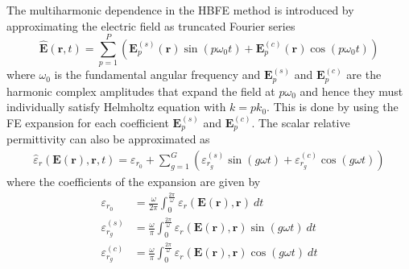 \documentclass[journal,twoside]{IEEEtran}
\renewcommand{\vec}[1]{\mathbf{#1}}
\begin{document}
The multiharmonic dependence in the HBFE method is introduced
by approximating the electric field as truncated Fourier series
\cite{Copeland2010}
%
\begin{equation} \label{eq:field}
\vec{\hat{E}}(\vec{r}, t) = \sum^P_{p=1} \left( \vec{E}_{p}^{(s)}(\vec{r}) 
\sin(p\omega_0 t) + \vec{E}_p^{(c)}(\vec{r}) \cos(p \omega_0 t) \right)
\end{equation}
%
\noindent where $\omega_0$ is the fundamental angular frequency and
$\vec{E}_{p}^{(s)}$ and $\vec{E}_{p}^{(c)}$ are the harmonic complex amplitudes 
that expand the field at $p\omega_0$ and hence they must individually
satisfy Helmholtz equation with $k=pk_0$. 
This is done 
by using the FE expansion for each coefficient 
$\vec{E}_{p}^{(s)}$ and $\vec{E}_{p}^{(c)}$.
The scalar relative permittivity can also be approximated as \cite{Copeland2010}
%
\begin{eqnarray} \label{eq:eps}
\hat{{\varepsilon}}_r(\vec{E}(\vec{r}), \vec{r}, t) = {\varepsilon}_{r_0} + 
\sum^G_{g=1} \left( {\varepsilon}_{r_g}^{(s)} \sin(g \omega t) + 
{\varepsilon}_{r_g}^{(c)} \cos(g \omega t)
\right)
\end{eqnarray} 
\noindent where the coefficients of the expansion are given by
\begin{align} \label{eq:epsCoeffs}
{\varepsilon}_{r_{0}} &=  \frac{\omega}{2\pi}\int_0^{\frac{2\pi}{\omega}}
{\varepsilon}_r(\vec{E}(\vec{r}), \vec{r}) \ dt \nonumber \\
{\varepsilon}_{r_{g}}^{(s)} &=  \frac{\omega}{\pi}\int_0^{\frac{2\pi}{\omega}}
{\varepsilon}_r(\vec{E}(\vec{r}), \vec{r}) \sin(g \omega t) \ dt \\ 
{\varepsilon}_{r_{g}}^{(c)} &=  \frac{\omega}{\pi}\int_0^{\frac{2\pi}{\omega}} 
{\varepsilon}_r(\vec{E}(\vec{r}), \vec{r}) \cos(g \omega t) \ dt
\nonumber 
\end{align} 
\end{document}
